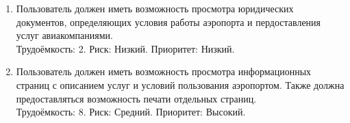\begin{enumerate}
    \item Пользователь должен иметь возможность просмотра юридических 
          документов, определяющих условия работы аэропорта и пердоставления 
          услуг авиакомпаниями. \\
          Трудоёмкость: 2. Риск: Низкий. Приоритет: Низкий.

    \item Пользователь должен иметь возможность просмотра информационных 
          страниц с описанием услуг и условий пользования аэропортом. 
          Также должна предоставляться возможность печати отдельных страниц. \\
          Трудоёмкость: 8. Риск: Средний. Приоритет: Высокий.
\end{enumerate}
